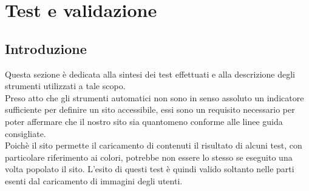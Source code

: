 \documentclass[a4paper,12pt]{article}
\begin{document}
\section{Test e validazione}
\subsection{Introduzione}
Questa sezione è dedicata alla sintesi dei test effettuati e alla descrizione degli strumenti utilizzati a tale scopo.\\
Preso atto che gli strumenti automatici non sono in senso assoluto un indicatore sufficiente per definire un sito accessibile, essi sono un requisito necessario per poter affermare che il nostro sito sia quantomeno conforme alle linee guida consigliate.\\
Poichè il sito permette il caricamento di contenuti il risultato di alcuni test, con particolare riferimento ai colori, potrebbe non essere lo stesso se eseguito una volta popolato il sito. L'esito di questi test è quindi valido soltanto nelle parti esenti dal caricamento di immagini degli utenti.
\end{document}
